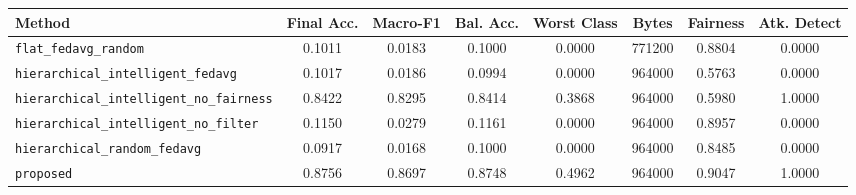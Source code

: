 \begin{tabular}{lccccccc}
\toprule
Method & Final Acc. & Macro-F1 & Bal. Acc. & Worst Class & Bytes & Fairness & Atk. Detect \\
\midrule
\texttt{flat\_fedavg\_random} & 0.1011 & 0.0183 & 0.1000 & 0.0000 & 771200 & 0.8804 & 0.0000 \\
\texttt{hierarchical\_intelligent\_fedavg} & 0.1017 & 0.0186 & 0.0994 & 0.0000 & 964000 & 0.5763 & 0.0000 \\
\texttt{hierarchical\_intelligent\_no\_fairness} & 0.8422 & 0.8295 & 0.8414 & 0.3868 & 964000 & 0.5980 & 1.0000 \\
\texttt{hierarchical\_intelligent\_no\_filter} & 0.1150 & 0.0279 & 0.1161 & 0.0000 & 964000 & 0.8957 & 0.0000 \\
\texttt{hierarchical\_random\_fedavg} & 0.0917 & 0.0168 & 0.1000 & 0.0000 & 964000 & 0.8485 & 0.0000 \\
\texttt{proposed} & 0.8756 & 0.8697 & 0.8748 & 0.4962 & 964000 & 0.9047 & 1.0000 \\
\bottomrule
\end{tabular}
